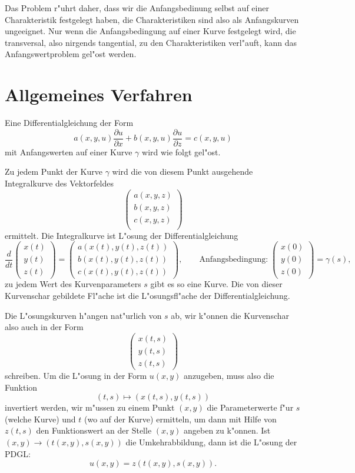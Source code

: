 Das Problem r"uhrt daher, dass wir die Anfangsbedinung selbst auf einer
Charakteristik festgelegt haben, die Charakteristiken sind also als
Anfangskurven ungeeignet. Nur wenn die Anfangsbedingung auf einer Kurve
festgelegt wird, die transversal, also nirgends tangential, zu den
Charakteristiken verl"auft, kann das Anfangswertproblem gel"ost werden.

\section{Allgemeines Verfahren}
Eine Differentialgleichung der Form
$$
a(x,y,u)\frac{\partial u}{\partial x}+b(x,y,u)\frac{\partial u}{\partial z}=c(x,y,u)
$$
mit Anfangswerten auf einer Kurve $\gamma$ wird wie folgt gel"ost.

Zu jedem Punkt der Kurve $\gamma$ wird die von diesem Punkt ausgehende
Integralkurve des Vektorfeldes
$$
\begin{pmatrix}
a(x,y,z)\\
b(x,y,z)\\
c(x,y,z)\\
\end{pmatrix}
$$
ermittelt. Die Integralkurve ist L"osung der Differentialgleichung
\[
\frac{d}{dt}
\begin{pmatrix}x(t)\\y(t)\\z(t)\end{pmatrix}
=
\begin{pmatrix}
a(x(t),y(t),z(t))\\
b(x(t),y(t),z(t))\\
c(x(t),y(t),z(t))
\end{pmatrix},
\qquad
\text{Anfangsbedingung:}\;
\begin{pmatrix}x(0)\\y(0)\\z(0)\end{pmatrix}
=\gamma(s),
\]
zu jedem Wert des Kurvenparameters $s$ gibt es so eine Kurve.
Die von dieser Kurvenschar gebildete Fl"ache ist die L"osungsfl"ache
der Differentialgleichung.

Die L"osungskurven h"angen nat"urlich von $s$ ab, wir k"onnen die
Kurvenschar also auch in der Form
$$
\begin{pmatrix}
x(t,s)\\
y(t,s)\\
z(t,s)
\end{pmatrix}
$$
schreiben.
Um die L"osung in der Form $u(x,y)$ anzugeben, muss also die Funktion
$$
(t,s)\mapsto (x(t,s),y(t,s))
$$
invertiert werden, wir m"ussen zu einem Punkt $(x,y)$ die Parameterwerte
f"ur $s$ (welche Kurve) und $t$ (wo auf der Kurve) ermitteln, um dann
mit Hilfe von $z(t,s)$ den Funktionswert an der Stelle $(x,y)$
angeben zu k"onnen.
Ist $(x,y)\to (t(x,y),s(x,y))$ die Umkehrabbildung, dann
ist die L"osung der PDGL:
$$
u(x,y)=z(t(x,y),s(x,y)).
$$

